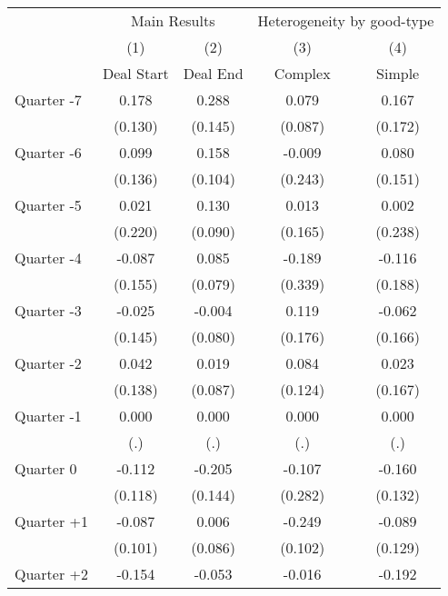\begin{tabular}{l*{4}{c}}
\hline\hline
            &\multicolumn{2}{c}{Main Results}&\multicolumn{2}{c}{Heterogeneity by good-type}\\\cmidrule(lr){2-3}\cmidrule(lr){4-5}
            &\multicolumn{1}{c}{(1)}&\multicolumn{1}{c}{(2)}&\multicolumn{1}{c}{(3)}&\multicolumn{1}{c}{(4)}\\
            &\multicolumn{1}{c}{Deal Start}&\multicolumn{1}{c}{Deal End}&\multicolumn{1}{c}{Complex}&\multicolumn{1}{c}{Simple}\\
\hline
Quarter -7  &       0.178&       0.288&       0.079&       0.167\\
            &     (0.130)&     (0.145)&     (0.087)&     (0.172)\\
[1em]
Quarter -6  &       0.099&       0.158&      -0.009&       0.080\\
            &     (0.136)&     (0.104)&     (0.243)&     (0.151)\\
[1em]
Quarter -5  &       0.021&       0.130&       0.013&       0.002\\
            &     (0.220)&     (0.090)&     (0.165)&     (0.238)\\
[1em]
Quarter -4  &      -0.087&       0.085&      -0.189&      -0.116\\
            &     (0.155)&     (0.079)&     (0.339)&     (0.188)\\
[1em]
Quarter -3  &      -0.025&      -0.004&       0.119&      -0.062\\
            &     (0.145)&     (0.080)&     (0.176)&     (0.166)\\
[1em]
Quarter -2  &       0.042&       0.019&       0.084&       0.023\\
            &     (0.138)&     (0.087)&     (0.124)&     (0.167)\\
[1em]
Quarter -1  &       0.000&       0.000&       0.000&       0.000\\
            &         (.)&         (.)&         (.)&         (.)\\
[1em]
Quarter 0   &      -0.112&      -0.205&      -0.107&      -0.160\\
            &     (0.118)&     (0.144)&     (0.282)&     (0.132)\\
[1em]
Quarter +1  &      -0.087&       0.006&      -0.249&      -0.089\\
            &     (0.101)&     (0.086)&     (0.102)&     (0.129)\\
[1em]
Quarter +2  &      -0.154&      -0.053&      -0.016&      -0.192\\

\end{tabular}
